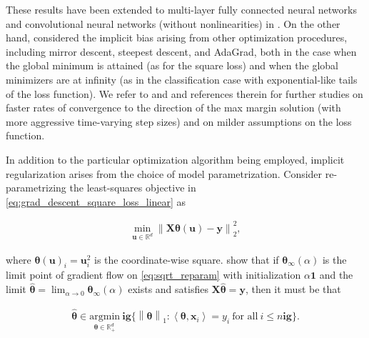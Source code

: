 	

These results have been extended to multi-layer fully connected neural networks and convolutional neural networks (without nonlinearities) in  \cite{gunasekar2018implicit}. On the other hand, \cite{gunasekar18a} considered the implicit bias arising from other optimization procedures, including mirror descent, steepest descent, and AdaGrad, both in the case when the global minimum is attained (as for the square loss) and when the global minimizers are at infinity (as in the classification case with exponential-like tails of the loss function). We refer to \cite{ji2019refined} and \cite{nacson2019convergence} and references therein for further studies on faster rates of convergence to the direction of the max margin solution (with more aggressive time-varying step sizes) and on milder assumptions on the loss function. 

In addition to the particular optimization algorithm being employed, implicit regularization arises from the choice of model parametrization. Consider re-parametrizing the least-squares objective in \eqref{eq:grad_descent_square_loss_linear} as

\begin{align}
	\label{eq:sqrt_reparam}
	\min_{{\boldsymbol u}\in{\mathbb R}^d} \left\|{\boldsymbol X} {\boldsymbol \theta}({\boldsymbol u}) - {\boldsymbol y}\right\|^2_2,
\end{align}

where ${\boldsymbol \theta}({\boldsymbol u})_i = {\boldsymbol u}_i^2$ is the coordinate-wise square. \cite{gunasekar2017implicit} show that if ${\boldsymbol \theta}_\infty(\alpha)$ is the limit point of gradient flow on \eqref{eq:sqrt_reparam} with initialization $\alpha \boldsymbol{1}$ and the limit $\widehat{{\boldsymbol \theta}}=\lim_{\alpha\to 0} {\boldsymbol \theta}_\infty(\alpha)$ exists and satisfies ${\boldsymbol X} \widehat{{\boldsymbol \theta}} = {\boldsymbol y}$, then it must be that

\begin{align}
	\widehat{{\boldsymbol \theta}} \in \underset{{\boldsymbol \theta}\in {\mathbb R}^d_+}{\mathrm{argmin}} \  \mathbf{ig}\{ \left\|{\boldsymbol \theta}\right\|_1 : \left\langle {\boldsymbol \theta},{\boldsymbol x}_i \right\rangle = y_i ~\text{for all}~ i \leq n \mathbf{ig}\}.
\end{align}

